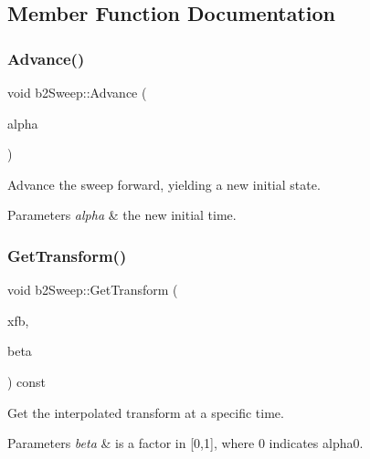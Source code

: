 \subsection{Member Function Documentation}
\mbox{\label{structb2_sweep_a35eb9b976ca87c9b8d758bec070c6c06}} 
\subsubsection{\texorpdfstring{Advance()}{Advance()}}
{\footnotesize\ttfamily void b2\+Sweep\+::\+Advance (\begin{DoxyParamCaption}\item[{float32}]{alpha }\end{DoxyParamCaption})\hspace{0.3cm}{\ttfamily [inline]}}

Advance the sweep forward, yielding a new initial state. 
\begin{DoxyParams}{Parameters}
{\em alpha} & the new initial time. \\
\hline
\end{DoxyParams}
\mbox{\label{structb2_sweep_a22ae50509de51876aefc48cd76248c61}} 
\subsubsection{\texorpdfstring{Get\+Transform()}{GetTransform()}}
{\footnotesize\ttfamily void b2\+Sweep\+::\+Get\+Transform (\begin{DoxyParamCaption}\item[{\hyperlink{structb2_transform}{b2\+Transform} $\ast$}]{xfb,  }\item[{float32}]{beta }\end{DoxyParamCaption}) const\hspace{0.3cm}{\ttfamily [inline]}}

Get the interpolated transform at a specific time. 
\begin{DoxyParams}{Parameters}
{\em beta} & is a factor in \mbox{[}0,1\mbox{]}, where 0 indicates alpha0. \\
\hline
\end{DoxyParams}
\mbox{\label{structb2_sweep_ad66a3086bc7656df9cf7454013a2f61b}} 

